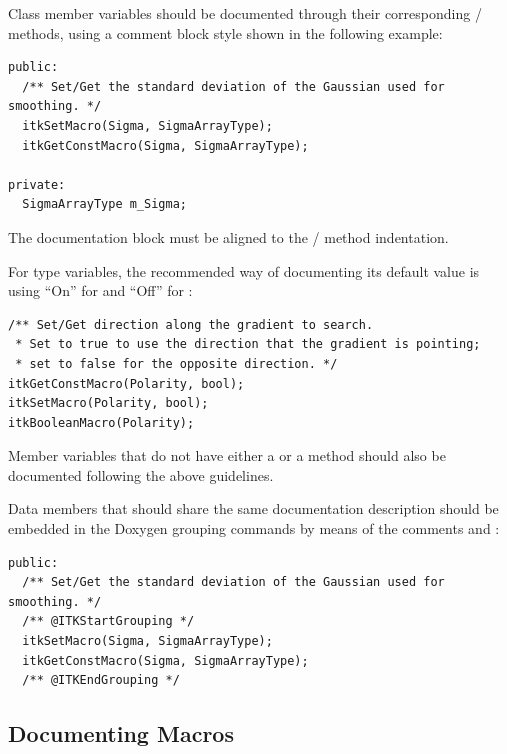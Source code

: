 Class member variables should be documented through their corresponding
/ methods, using a comment block style shown in
the following example:

\small
\begin{verbatim}
public:
  /** Set/Get the standard deviation of the Gaussian used for smoothing. */
  itkSetMacro(Sigma, SigmaArrayType);
  itkGetConstMacro(Sigma, SigmaArrayType);

private:
  SigmaArrayType m_Sigma;

\end{verbatim}
\normalsize

The documentation block must be aligned to the /
method indentation.

For  type variables, the recommended way of documenting its default
value is using ``On'' for  and ``Off'' for :

\small
\begin{verbatim}
/** Set/Get direction along the gradient to search.
 * Set to true to use the direction that the gradient is pointing;
 * set to false for the opposite direction. */
itkGetConstMacro(Polarity, bool);
itkSetMacro(Polarity, bool);
itkBooleanMacro(Polarity);
\end{verbatim}
\normalsize

Member variables that do not have either a  or a
 method should also be documented following the above
guidelines.

Data members that should share the same documentation description should be embedded in
the Doxygen grouping commands by means of the comments 
and :

\small
\begin{verbatim}
public:
  /** Set/Get the standard deviation of the Gaussian used for smoothing. */
  /** @ITKStartGrouping */
  itkSetMacro(Sigma, SigmaArrayType);
  itkGetConstMacro(Sigma, SigmaArrayType);
  /** @ITKEndGrouping */

\end{verbatim}
\normalsize


\subsection{Documenting Macros}%
\label{subsec:DocumentingMacros}

